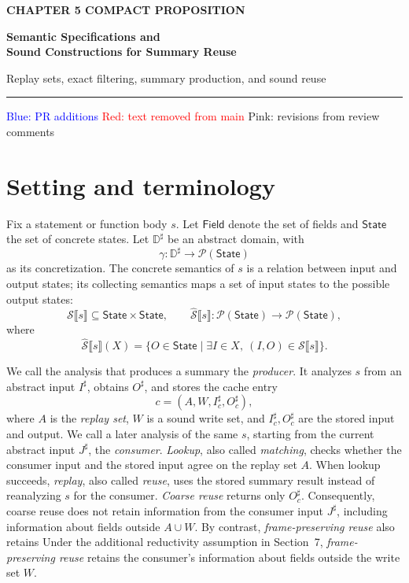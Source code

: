 \documentclass[10pt]{article}
\newcommand{\REV}[1]{{\color{reviewpink}#1}}
\newcommand{\Field}{\mathsf{Field}}
\newcommand{\State}{\mathsf{State}}
\newcommand{\Semantics}[1]{\mathcal S\mathopen{⟦}#1\mathclose{⟧}}
\newcommand{\CollectingSemantics}[1]{\widehat{\mathcal S}\mathopen{⟦}#1\mathclose{⟧}}
\providecommand{\DIFaddtex}[1]{{\protect\color{blue} #1}} %
\providecommand{\DIFdeltex}[1]{{\protect\color{red} \scriptsize #1}} %
\providecommand{\DIFaddbegin}{} %
\providecommand{\DIFaddend}{} %
\providecommand{\DIFdelbegin}{} %
\providecommand{\DIFdelend}{} %
\providecommand{\DIFadd}[1]{\texorpdfstring{\DIFaddtex{#1}}{#1}} %
\providecommand{\DIFdel}[1]{\texorpdfstring{\DIFdeltex{#1}}{}} %
\begin{document}
{\sffamily\bfseries\color{proofred}\fontsize{10.5}{13}\selectfont CHAPTER 5 COMPACT PROPOSITION\par}
\vspace{4mm}
{\sffamily\bfseries\fontsize{23}{27}\selectfont
Semantic Specifications and\\
Sound Constructions for Summary Reuse\par}
\vspace{4mm}
{\color{muted}\large Replay sets, exact filtering, summary production, and sound reuse\par}
\vspace{4mm}
{\color{proofred}\rule{\textwidth}{1pt}\par}
{\small\textcolor{blue}{Blue: PR additions}\quad
 \textcolor{red}{Red: text removed from main}\quad
 \textcolor{reviewpink}{Pink: revisions from review comments}\par}

\section{Setting and terminology}

Fix a statement or function body \(s\). Let \(\Field\) denote the set of fields and
\(\State\) the set of concrete states. Let \(\mathbb D^\sharp\) be an abstract domain, with
\[
  \gamma:\mathbb D^\sharp\to\mathcal P(\State)
\]
as its concretization. The concrete semantics of \(s\) is a relation between input and output
states; its collecting semantics maps a set of input states to the possible output states:
\[
  \Semantics{s}\subseteq\State\times\State,
  \qquad
  \CollectingSemantics{s}:\mathcal P(\State)\to\mathcal P(\State),
\]
where
\[
  \CollectingSemantics{s}(X)
  =\{O\in\State\mid \exists I\in X,\ (I,O)\in\Semantics{s}\}.
\]

We call the analysis that produces a summary the \emph{producer}. It analyzes \(s\) from an
abstract input \(I^\sharp\), obtains \(O^\sharp\), and stores the cache entry
\[
  c=(A,W,I_c^\sharp,O_c^\sharp),
\]
where \(A\) is the \emph{replay set}, \(W\) is a sound write set, and
\(I_c^\sharp,O_c^\sharp\) are the stored input and output. We call a later analysis of the
same \(s\), starting from the current abstract input \(J^\sharp\), the \emph{consumer}.
\emph{Lookup}, also called \emph{matching}, checks whether the consumer input and the stored
input agree on the replay set \(A\). When lookup succeeds, \emph{replay}, also called
\emph{reuse}, uses the stored summary result instead of reanalyzing \(s\) for the consumer.
\emph{Coarse reuse} returns only \(O_c^\sharp\). Consequently, coarse reuse does not retain
information from the consumer input \(J^\sharp\), including information about fields outside
\(A\cup W\). \DIFdelbegin \DIFdel{By contrast, \emph{frame-preserving reuse} also retains }\DIFdelend \DIFaddbegin \DIFadd{\REV{Under the additional reductivity assumption in Section~7,}
\emph{frame-preserving reuse} \REV{retains} }\DIFaddend the consumer's information about fields outside the
write set \(W\).
\end{document}
